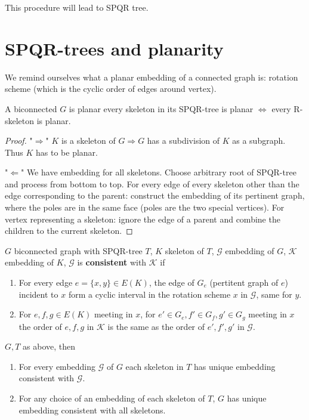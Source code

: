 \noindent This procedure will lead to SPQR tree.

\section{SPQR-trees and planarity}

We remind ourselves what a planar embedding of a connected graph is: rotation scheme (which is the cyclic order of edges around vertex).

\begin{thm}
	A biconnected $G$ is planar \ifft every skeleton in its SPQR-tree is planar $\iff$ every R-skeleton is planar.
\end{thm}

\begin{proof}
	"$\Rightarrow$" $K$ is a skeleton of $G \Rightarrow G$ has a subdivision of $K$ as a subgraph. Thus $K$ has to be planar.
	
	"$\Leftarrow$" We have embedding for all skeletons. Choose arbitrary root of SPQR-tree and process from bottom to top. For every edge of every skeleton other than the edge corresponding to the parent: construct the embedding of its pertinent graph, where the poles are in the same face (poles are the two special vertices). For vertex representing a skeleton: ignore the edge of a parent and combine the children to the current skeleton.
\end{proof}

\begin{defn}
	$G$ biconnected graph with SPQR-tree $T$, $K$ skeleton of $T$, $\mathcal{G}$ embedding of $G$, $\mathcal{K}$ embedding of $K$, $\mathcal{G}$ is \textbf{consistent} with $\mathcal{K}$ if
	
	\begin{enumerate}
		\item For every edge $e = \{x,y\} \in E(K)$, the edge of $G_e$ (pertitent graph of $e$) incident to $x$ form a cyclic interval in the rotation scheme $x$ in $\mathcal{G}$, same for $y$.
		\item For $e,f,g \in E(K)$ meeting in $x$, for $e' \in G_e, f' \in G_f, g' \in G_g$ meeting in $x$ the order of $e,f,g$ in $\mathcal{K}$ is the same as the order of $e',f',g'$ in $\mathcal{G}$.
	\end{enumerate}
\end{defn}

\begin{thm}
	$G,T$ as above, then
	
	\begin{enumerate}
		\item For every embedding $\mathcal{G}$ of $G$ each skeleton in $T$ has unique embedding consistent with $\mathcal{G}$.
		\item For any choice of an embedding of each skeleton of $T$, $G$ has unique embedding consistent with all skeletons.
	\end{enumerate}
\end{thm}

